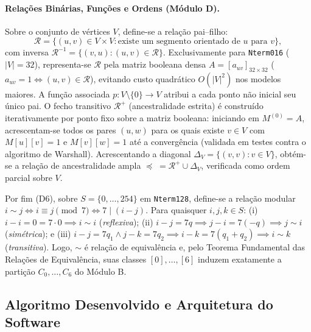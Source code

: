 \documentclass[11pt, a4paper]{article}
\begin{document}
\paragraph{Relações Binárias, Funções e Ordens (Módulo D).}
Sobre o conjunto de vértices $V$, define-se a relação pai--filho:
\begin{equation}
  \mathcal{R} = \{(u, v) \in V \times V : \text{existe um segmento orientado de } u \text{ para } v\},
  \label{eq:relacao_R}
\end{equation}
com inversa $\mathcal{R}^{-1} = \{(v, u) : (u, v) \in \mathcal{R}\}$. Exclusivamente para \texttt{Nterm016} ($|V| = 32$), representa-se $\mathcal{R}$ pela matriz booleana densa $A = [a_{uv}]_{32\times 32}$ ($a_{uv} = 1 \iff (u,v) \in \mathcal{R}$), evitando custo quadrático $O(|V|^2)$ nos modelos maiores. A função associada $p : V \setminus \{0\} \to V$ atribui a cada ponto não inicial seu único pai. O fecho transitivo $\mathcal{R}^+$ (ancestralidade estrita) é construído iterativamente por ponto fixo sobre a matriz booleana: iniciando em $M^{(0)} = A$, acrescentam-se todos os pares $(u, w)$ para os quais existe $v \in V$ com $M[u][v] = 1$ e $M[v][w] = 1$ até a convergência (validada em testes contra o algoritmo de Warshall). Acrescentando a diagonal $\Delta_V = \{(v,v) : v \in V\}$, obtém-se a relação de ancestralidade ampla $\preceq \; = \mathcal{R}^+ \cup \Delta_V$, verificada como ordem parcial sobre $V$.

Por fim (D6), sobre $S = \{0,\dots,254\}$ em \texttt{Nterm128}, define-se a relação modular $i \sim j \iff i \equiv j \pmod{7} \iff 7 \mid (i - j)$. Para quaisquer $i, j, k \in S$: (i) $i - i = 0 = 7\cdot 0 \implies i \sim i$ (\emph{reflexiva}); (ii) $i - j = 7q \implies j - i = 7(-q) \implies j \sim i$ (\emph{simétrica}); e (iii) $i - j = 7q_1 \land j - k = 7q_2 \implies i - k = 7(q_1 + q_2) \implies i \sim k$ (\emph{transitiva}). Logo, $\sim$ é relação de equivalência e, pelo Teorema Fundamental das Relações de Equivalência, suas classes $[0], \dots, [6]$ induzem exatamente a partição $C_0, \dots, C_6$ do Módulo B.

\subsection{Algoritmo Desenvolvido e Arquitetura do Software}
\end{document}

